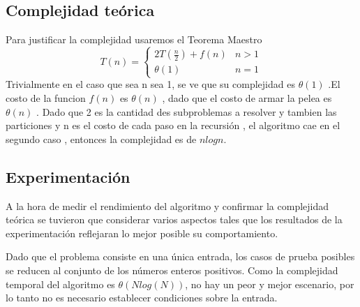         

    \subsection{Complejidad teórica}
         
        Para justificar la complejidad usaremos el Teorema Maestro 
        \[T(n) = \begin{cases} 2T(\frac{n}{2}) + f(n) &  n > 1 \\
                                \theta(1) & n = 1    \end{cases} \]
        Trivialmente en el caso que sea n sea 1, se ve que su complejidad es $\theta(1)$ .El costo de la funcion  $f(n)$ es $\theta(n)$ , dado que el costo de armar la pelea es  $\theta(n)$  .
        Dado que 2 es la cantidad des subproblemas a resolver y tambien las particiones y n es el costo de cada paso en la recursión , el algoritmo cae en el segundo caso , entonces la complejidad es de $ n log n$.




    \subsection{Experimentación}

	A la hora de medir el rendimiento del algoritmo y confirmar la complejidad
	teórica se tuvieron que considerar varios aspectos tales que los
	resultados de la experimentación reflejaran lo mejor posible su
	comportamiento.

	Dado que el problema consiste en una única entrada, los casos de prueba
	posibles se reducen al conjunto de los números enteros positivos. Como la
	complejidad temporal del algoritmo es $\theta(Nlog(N))$, no hay un peor
	y mejor escenario, por lo tanto no es necesario establecer condiciones sobre
	la entrada.

